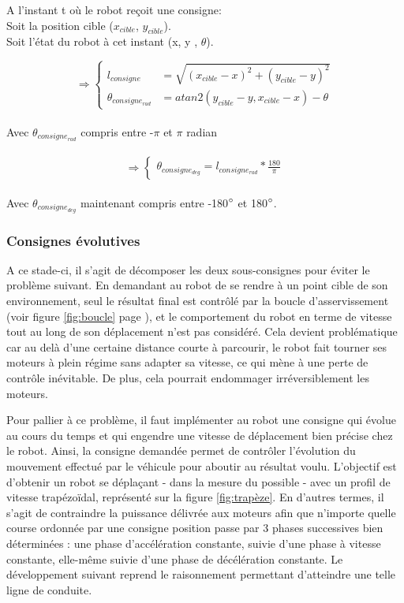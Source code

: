 \documentclass[a4paper,11pt]{article}
\begin{document}
A l'instant t où le robot reçoit une consigne:\\
Soit la position cible ($x_{cible}$, $y_{cible}$).\\
Soit l'état du robot à cet instant (x, y , $\theta$).

\begin{equation*}
    \Rightarrow\left\{
        \begin{aligned}
            l_{consigne} & = \sqrt{(x_{cible}-x)^2+(y_{cible}-y)^2}\\ 
            \theta_{consigne_{rad}} & = atan2(y_{cible}-y, x_{cible}-x)-\theta
        \end{aligned}
    \right.
\end{equation*}\\
Avec $\theta_{consigne_{rad}}$ compris entre -$\pi$ et $\pi$ radian\\\\
\begin{equation*}
    \Rightarrow\left\{
        \begin{aligned}
            \theta_{consigne_{deg}} = l_{consigne_{rad}}*\frac{180}{\pi}
        \end{aligned}
    \right.
\end{equation*}\\
Avec $\theta_{consigne_{deg}}$ maintenant compris entre -180$\degree$ et 180$\degree$.

\subsubsection{\label{evo}Consignes évolutives}

A ce stade-ci, il s'agit de décomposer les deux sous-consignes pour éviter le problème suivant. En demandant au robot de se rendre à un point cible de son environnement, seul le résultat final est contrôlé par la boucle d'asservissement (voir figure \ref{fig:boucle} page \pageref{fig:boucle}), et le comportement du robot en terme de vitesse tout au long de son déplacement n'est pas considéré. Cela devient problématique car au delà d'une certaine distance courte à parcourir, le robot fait tourner ses moteurs à plein régime sans adapter sa vitesse, ce qui mène à une perte de contrôle inévitable. De plus, cela pourrait endommager irréversiblement les moteurs.

Pour pallier à ce problème, il faut implémenter au robot une consigne qui évolue au cours du temps et qui engendre une vitesse de déplacement bien précise chez le robot. Ainsi, la consigne demandée permet de contrôler l'évolution du mouvement effectué par le véhicule pour aboutir au résultat voulu. L'objectif est d'obtenir un robot se déplaçant - dans la mesure du possible - avec un profil de vitesse trapézoïdal, représenté sur la figure \ref{fig:trapèze}. En d'autres termes, il s'agit de contraindre la puissance délivrée aux moteurs afin que n'importe quelle course ordonnée par une consigne position passe par 3 phases successives bien déterminées : une phase d'accélération constante, suivie d'une phase à vitesse constante, elle-même suivie d'une phase de décélération constante. Le développement suivant reprend le raisonnement permettant d'atteindre une telle ligne de conduite.
\end{document}
